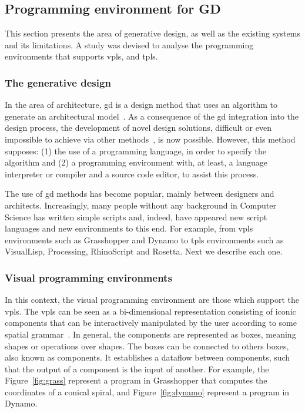 \subsection{Programming environment for GD}
\label{sec:gd}

This section presents the area of generative design, as well as the existing systems and its limitations. A study was devised to analyse the programming environments that supports \ac{vpls}, and \ac{tpls}.

\subsubsection{The generative design}

In the area of architecture, \ac{gd} is a design method that uses an algorithm to generate an architectural model~\cite{terzidis2003expressive}. As a consequence of the \ac{gd} integration into the design process, the development of novel design solutions, difficult or even impossible to achieve via other methods~\cite{mccormack2004generative}, is now possible. However, this method supposes: (1) the use of a programming language, in order to specify the algorithm and (2) a programming environment with, at least, a language interpreter or compiler and a source code editor, to assist this process.

The use of \ac{gd} methods has become popular, mainly between designers and architects. Increasingly, many people without any background in Computer Science has written simple scripts and, indeed, have appeared new script languages and new environments to this end. For example, from \ac{vpls} environments such as Grasshopper and Dynamo to \ac{tpls} environments such as  VisualLisp, Processing, RhinoScript and Rosetta. Next we describe each one.

\subsubsection{Visual programming environments}
In this context, the visual programming environment are those which support the \ac{vpls}. The \ac{vpls} can be seen as a bi-dimensional representation consisting of iconic components that can be interactively manipulated by the user according to some spatial grammar~\cite{myers1990taxonomies}. In general, the components are represented as boxes, meaning shapes or operations over shapes. The boxes can be connected to others boxes, also known as components. It establishes a dataflow between components, such that the output of a component is the input of another. For example, the Figure~\ref{fig:grass} represent a program in Grasshopper that computes the coordinates of a conical spiral, and Figure~\ref{fig:dynamo} represent a program in Dynamo.


